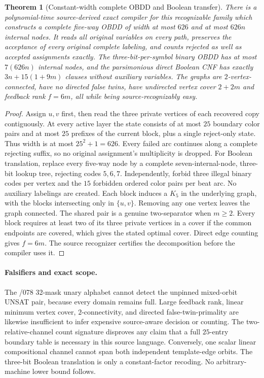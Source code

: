 \documentclass[11pt]{article}
\newtheorem{theorem}{Theorem}
\begin{document}
\begin{theorem}[Constant-width complete OBDD and Boolean transfer]
There is a polynomial-time source-derived exact compiler for
this recognizable family which constructs a complete five-way
OBDD of width at most $626$ and at most $626n$ internal nodes.
It reads all original variables on every path, preserves
the acceptance of every original complete labeling, and
counts rejected as well as accepted assignments exactly.
The three-bit-per-symbol binary OBDD has at most $7(626n)$
internal nodes, and the parsimonious direct Boolean CNF has
exactly $3n+15(1+9m)$ clauses without auxiliary variables.
The graphs are $2$-vertex-connected, have no directed false
twins, have undirected vertex cover $2+2m$ and feedback rank
$f=6m$, all while being source-recognizably easy.
\end{theorem}
\begin{proof}
Assign $u,v$ first, then read the three private vertices of
each recovered copy contiguously. At every active layer the
state consists of at most $25$ boundary color pairs and at
most $25$ prefixes of the current block, plus a single
reject-only state. Thus width is at most $25^2+1=626$.
Every failed arc continues along a complete rejecting
suffix, so no original assignment's multiplicity is dropped.
For Boolean translation, replace every five-way node by
a complete seven-internal-node, three-bit lookup tree,
rejecting codes $5,6,7$. Independently, forbid three
illegal binary codes per vertex and the $15$ forbidden
ordered color pairs per beat arc. No auxiliary labelings
are created. Each block induces a $K_5$ in the underlying
graph, with the blocks intersecting only in $\{u,v\}$.
Removing any one vertex leaves the graph connected.
The shared pair is a genuine two-separator when $m\ge2$.
Every block requires at least two of its three private
vertices in a cover if the common endpoints are covered,
which gives the stated optimal cover. Direct edge counting
gives $f=6m$. The source recognizer certifies the decomposition
before the compiler uses it.
\end{proof}

\paragraph{Falsifiers and exact scope.}
The /078 32-mask unary alphabet cannot detect the unpinned
mixed-orbit UNSAT pair, because every domain remains full.
Large feedback rank, linear minimum vertex cover,
$2$-connectivity, and directed false-twin-primality are
likewise insufficient to infer expensive source-aware
decision or counting. The two-relative-channel count
signature disproves any claim that a full $25$-entry
boundary table is necessary in this source language.
Conversely, one scalar linear compositional channel
cannot span both independent template-edge orbits.
The three-bit Boolean translation is only a constant-factor
recoding. No arbitrary-machine lower bound follows.
\end{document}
